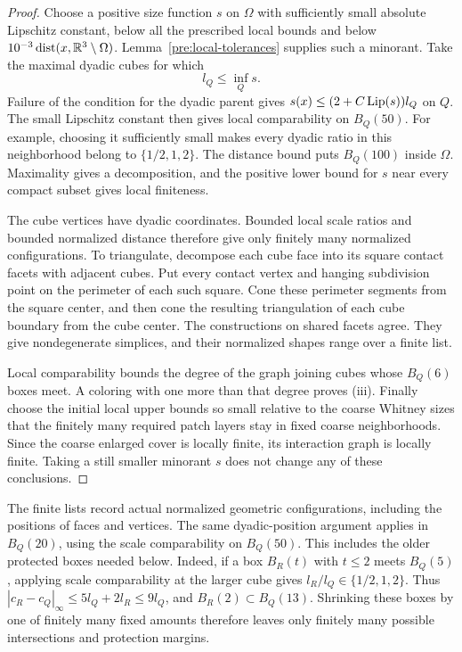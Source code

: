 \begin{proof}
Choose a positive size function $s$ on $\Omega$ with sufficiently
small absolute Lipschitz constant, below all the prescribed local
bounds and below $10^{-3}\operatorname{dist}(x,\mathbb R^3\setminus\Omega)$.
Lemma~\ref{pre:local-tolerances} supplies such a minorant.  Take the
maximal dyadic cubes for which
\[
 l_Q\le\inf_Qs.
\]
Failure of the condition for the dyadic parent gives
$s(x)\le(2+C\operatorname{Lip}(s))l_Q$ on $Q$.  The small Lipschitz constant
then gives local comparability on $B_Q(50)$.  For example, choosing
it sufficiently small makes every dyadic ratio in this neighborhood
belong to $\{1/2,1,2\}$.  The distance bound puts $B_Q(100)$ inside
$\Omega$.  Maximality gives a decomposition, and the positive lower
bound for $s$ near every compact subset gives local finiteness.

The cube vertices have dyadic coordinates.  Bounded local scale
ratios and bounded normalized distance therefore give only finitely
many normalized configurations.  To triangulate, decompose each
cube face into its square contact facets with adjacent cubes.
Put every contact vertex and hanging subdivision point on the
perimeter of each such square.  Cone these perimeter segments from
the square center, and then cone the resulting triangulation of
each cube boundary from the cube center.  The constructions on
shared facets agree.  They give nondegenerate simplices, and their
normalized shapes range over a finite list.

Local comparability bounds the degree of the graph joining cubes
whose $B_Q(6)$ boxes meet.  A coloring with one more than that
degree proves \textup{(iii)}.  Finally choose the initial local
upper bounds so small relative to the coarse Whitney sizes that
the finitely many required patch layers stay in fixed coarse
neighborhoods.  Since the coarse enlarged cover is locally finite,
its interaction graph is locally finite.  Taking a still smaller
minorant $s$ does not change any of these conclusions.
\end{proof}

The finite lists record actual normalized geometric configurations,
including the positions of faces and vertices.  The same
dyadic-position argument applies in $B_Q(20)$, using the scale
comparability on $B_Q(50)$.  This includes the older protected
boxes needed below.  Indeed, if a box $B_R(t)$ with $t\le2$ meets
$B_Q(5)$, applying scale comparability at the larger cube gives
$l_R/l_Q\in\{1/2,1,2\}$.  Thus
$|c_R-c_Q|_\infty\le5l_Q+2l_R\le9l_Q$, and
$B_R(2)\subset B_Q(13)$.  Shrinking these boxes by one of
finitely many fixed amounts therefore leaves only finitely many
possible intersections and protection margins.

